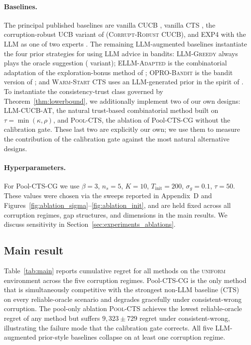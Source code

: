 \documentclass{article}
\theoremstyle{plain}
\theoremstyle{definition}
\theoremstyle{remark}
\newcommand{\algname}{Pool-CTS-CG}
\begin{document}
\paragraph{Baselines.} The principal published baselines are vanilla \textsc{CUCB} \citep{chen2013cucb}, vanilla \textsc{CTS} \citep{wang2018cts}, the corruption-robust UCB variant of \citet{kapoor2019corruption} (\textsc{Corrupt-Robust CUCB}), and \textsc{EXP4} with the LLM as one of two experts \citep{auer2002exp4}. The remaining LLM-augmented baselines instantiate the four prior strategies for using LLM advice in bandits: \textsc{LLM-Greedy} always plays the oracle suggestion (\citealp{krishnamurthy2024canllms} variant); \textsc{ELLM-Adapted} is the combinatorial adaptation of the exploration-bonus method of \citet{du2023ellm}; \textsc{OPRO-Bandit} is the bandit version of \citet{yang2024opro}; and \textsc{Warm-Start CTS} uses an LLM-generated prior in the spirit of \citet{alamdari2024jumpstarting}. To instantiate the consistency-trust class governed by Theorem~\ref{thm:lowerbound}, we additionally implement two of our own designs: \textsc{LLM-CUCB-AT}, the natural trust-based combinatorial method built on $\tau = \min(\kappa, \rho)$, and \textsc{Pool-CTS}, the ablation of \algname{} without the calibration gate. These last two are explicitly our own; we use them to measure the contribution of the calibration gate against the most natural alternative designs.

\paragraph{Hyperparameters.} For \algname{} we use $\beta = 3$, $n_s = 5$, $K = 10$, $T_{\mathrm{init}} = 200$, $\sigma_g = 0.1$, $\tau = 50$. These values were chosen via the sweeps reported in Appendix~D and Figures~\ref{fig:ablation_sigma}--\ref{fig:ablation_init}, and are held fixed across all corruption regimes, gap structures, and dimensions in the main results. We discuss sensitivity in Section~\ref{sec:experiments_ablations}.

\subsection{Main result}

Table~\ref{tab:main} reports cumulative regret for all methods on the \textsc{uniform} environment across the five corruption regimes. \algname{} is the only method that is simultaneously competitive with the strongest non-LLM baseline (\textsc{CTS}) on every reliable-oracle scenario and degrades gracefully under consistent-wrong corruption. The pool-only ablation \textsc{Pool-CTS} achieves the lowest reliable-oracle regret of any method but suffers $9{,}323 \pm 729$ regret under consistent-wrong, illustrating the failure mode that the calibration gate corrects. All five LLM-augmented prior-style baselines collapse on at least one corruption regime.
\end{document}
